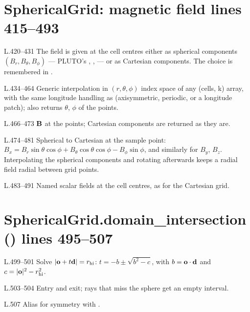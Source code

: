 \section*{\normalsize SphericalGrid: magnetic field \hfill{\small\mdseries\color{gray}lines 415--493}}

\begin{lines}
\item[L.420–431] The field is given at the cell centres either as spherical components $(B_r,B_\theta,B_\phi)$ --- PLUTO's , ,  --- or as Cartesian components. The choice is remembered in .
\item[L.434–464] Generic interpolation in $(r,\theta,\phi)$ index space of any (cells, k) array, with the same longitude handling as  (axisymmetric, periodic, or a longitude patch); also returns $\theta$, $\phi$ of the points.
\item[L.466–473] $\mathbf{B}$ at the points; Cartesian components are returned as they are.
\item[L.474–481] Spherical to Cartesian at the sample point: $B_x=B_r\sin\theta\cos\phi+B_\theta\cos\theta\cos\phi-B_\phi\sin\phi$, and similarly for $B_y$, $B_z$. Interpolating the spherical components and rotating afterwards keeps a radial field radial between grid points.
\item[L.483–491] Named scalar fields at the cell centres, as for the Cartesian grid.
\end{lines}
\section*{\normalsize SphericalGrid.domain\_intersection() \hfill{\small\mdseries\color{gray}lines 495--507}}

\begin{lines}
\item[L.499–501] Solve $|\mathbf{o}+t\mathbf{d}|=r_\text{hi}$: $t=-b\pm\sqrt{b^2-c}$, with $b=\mathbf{o}\cdot\mathbf{d}$ and $c=|\mathbf{o}|^2-r_\text{hi}^2$.
\item[L.503–504] Entry and exit; rays that miss the sphere get an empty interval.
\item[L.507] Alias for symmetry with .
\end{lines}
